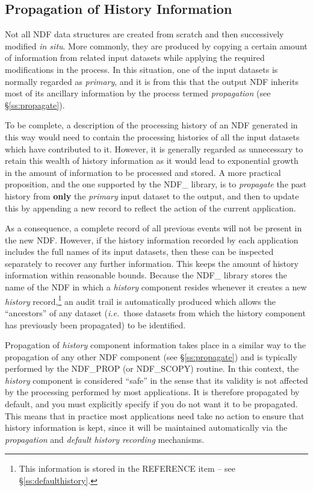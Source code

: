 \documentclass[twoside,11pt]{article}
\newcommand{\htmlref}[2]{#1}
\newcommand{\xlabel}[1]{}
\newcommand{\st}[1]{{\em{#1}}}
\begin{document}
\subsection{\xlabel{propagation_of_history_information}Propagation of History Information}

Not all NDF data structures are created from scratch and then
successively modified \st{in situ}. More commonly, they are produced
by copying a certain amount of information from related input datasets
while applying the required modifications in the process.  In this
situation, one of the input datasets is normally regarded as
\st{primary\/}, and it is from this that the output NDF inherits most
of its 
ancillary information by the process termed \st{propagation\/} (see
\S\ref{ss:propagate}).

To be complete, a description of the processing history of an NDF
generated in this way would need to contain the processing histories
of all the input datasets which have contributed to it. However, it is
generally regarded as unnecessary to retain this wealth of history
information as it would lead to exponential growth in the amount of
information to be processed and stored.  A more practical proposition,
and the one supported by the NDF\_ library, is to \st{propagate\/} the
past history from {\bf only} the \st{primary\/} input dataset to the
output, and then to update this by appending a new record to reflect
the action of the current application.

As a consequence, a complete record of all previous events will not be
present in the new NDF. However, if the history information recorded
by each application includes the full names of its input datasets,
then these can be inspected separately to recover any further
information. This keeps the amount of history information within
reasonable bounds.  Because the NDF\_ library stores the name of the
NDF in which a \st{history\/} component resides whenever it creates a
new \st{history\/} record,\footnote{This information is stored in the
REFERENCE item -- see \S\ref{ss:defaulthistory}.} an audit trail is
automatically produced which allows the ``ancestors'' of any dataset
(\st{i.e.}\ those datasets from which the history component has
previously been propagated) to be identified.

Propagation of \st{history\/} component information takes place in a
similar way to the propagation of any other NDF component (see
\S\ref{ss:propagate}) and is typically performed by the \htmlref{NDF\_PROP}{NDF_PROP} (or
\htmlref{NDF\_SCOPY}{NDF_SCOPY}) routine. In this context, the \st{history\/} component is
considered ``safe'' in the sense that its validity is not affected by
the processing performed by most applications. It is therefore
propagated by default, and you must explicitly specify if you do not
want it to be propagated. This means that in practice most
applications need take no action to ensure that history information is
kept, since it will be maintained automatically via the
\st{propagation\/} and \st{default history recording\/} mechanisms. 
\end{document}
